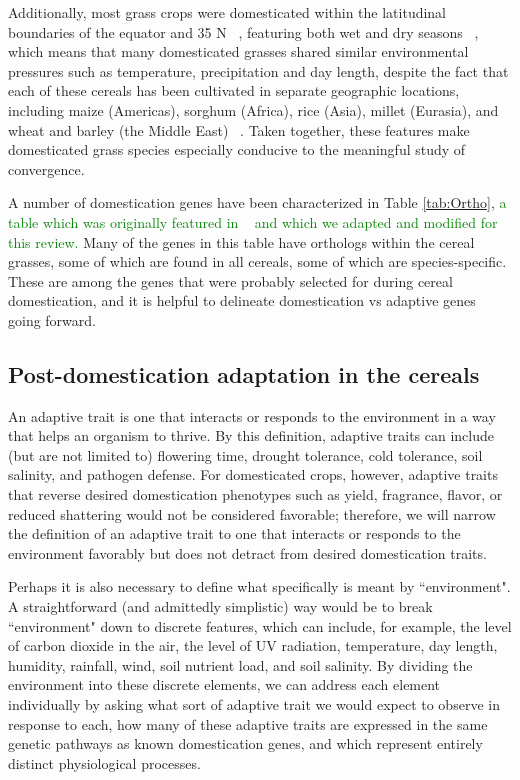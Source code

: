 \documentclass[12pt]{article}
\newcommand{\mw}[1]{\textcolor{green}{\normalsize #1}}
\begin{document}
Additionally, most grass crops were domesticated within the latitudinal boundaries of the equator and 35 N ~\citep{Jain1993, Gepts2010}, featuring both wet and dry seasons ~\citep{Jain1993}, which means that many domesticated grasses shared similar environmental pressures such as temperature, precipitation and day length, despite the fact that each of these cereals has been cultivated in separate geographic locations, including maize (Americas), sorghum (Africa), rice (Asia), millet (Eurasia), and wheat and barley (the Middle East) ~\citep{Glmin2009}. 
Taken together, these features make domesticated grass species especially conducive to the meaningful study of convergence.

A number of domestication genes have been characterized in Table \ref{tab:Ortho}, \mw{a table which was originally featured in ~\citep{Lenser2013} and which we adapted and modified for this review.} Many of the genes in this table have orthologs within the cereal grasses, some of which are found in all cereals, some of which are species-specific. These are among the genes that were probably selected for during cereal domestication, and it is helpful to delineate domestication vs adaptive genes going forward.

\subsection*{Post-domestication adaptation in the cereals}
An adaptive trait is one that interacts or responds to the environment in a way that helps an organism to thrive. 
By this definition, adaptive traits can include (but are not limited to) flowering time, drought tolerance, cold tolerance, soil salinity, and pathogen defense. 
For domesticated crops, however, adaptive traits that reverse desired domestication phenotypes such as yield, fragrance, flavor, or reduced shattering would not be considered favorable; therefore, we will narrow the definition of an adaptive trait to one that interacts or responds to the environment favorably but does not detract from desired domestication traits. 

Perhaps it is also necessary to define what specifically is meant by ``environment".
A straightforward (and admittedly simplistic) way would be to break ``environment" down to discrete features, which can include, for example, the level of carbon dioxide in the air, the level of UV radiation, temperature, day length, humidity, rainfall, wind, soil nutrient load, and soil salinity. 
By dividing the environment into these discrete elements, we can address each element individually by asking what sort of adaptive trait we would expect to observe in response to each, how many of these adaptive traits are expressed in the same genetic pathways as known domestication genes, and which represent entirely distinct physiological processes.
\end{document}
